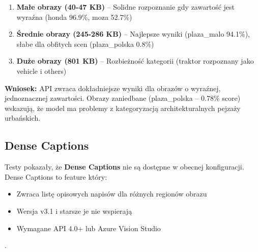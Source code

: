 \begin{enumerate}
	\item \textbf{Małe obrazy (40-47 KB)} – Solidne rozpoznanie gdy zawartość jest wyraźna (honda 96.9\%, moza 52.7\%)
	\item \textbf{Średnie obrazy (245-286 KB)} – Najlepsze wyniki (plaza\_malo 94.1\%), słabe dla obfitych scen (plaza\_polska 0.8\%)
	\item \textbf{Duże obrazy (801 KB)} – Rozbieżność kategorii (traktor rozpoznany jako vehicle i others)
\end{enumerate}

\textbf{Wniosek:} API zwraca dokładniejsze wyniki dla obrazów o wyraźnej, jednoznacznej zawartości. Obrazy zaniedbane (plaza\_polska – 0.78\% score) wskazują, że model ma problemy z kategoryzacją architekturalnych pejzaży urbańskich.



\subsection{Dense Captions}

Testy pokazały, że \textbf{Dense Captions} nie są dostępne w obecnej konfiguracji. Dense Captions to feature który:
\begin{itemize}
	\item Zwraca listę opisowych napisów dla różnych regionów obrazu
	\item Wersja v3.1 i starsze je nie wspierają
	\item Wymagane API 4.0+ lub Azure Vision Studio
\end{itemize}

.